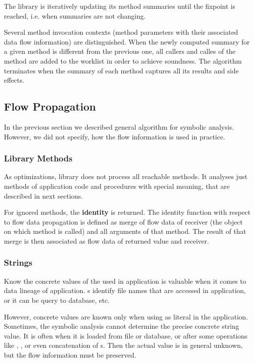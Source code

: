 The library is iteratively updating its method summaries until the fixpoint is reached, i.e.
when summaries are not changing.

Several method invocation contexts (method parameters with their associated data flow information)
are distinguished. When the newly computed summary for a given method is different from the previous
one, all callers and calles of the method are added to the worklist in order to achieve soundness.
The algorithm terminates when the summary of each method captures all its results and side effects.




\subsection{Flow Propagation}

In the previous section we described general algorithm for symbolic analysis.
However, we did not specify, how the flow information is used in practice.




\subsubsection{Library Methods}

As optimizations, library does not process all reachable methods.
It analyses just methods of application code and procedures with special
meaning, that are described in next sections.

For ignored methods, the \textbf{identity} is returned.
The identity function with respect to flow data propagation is defined as
merge of flow data of receiver (the object on which method is called) and
all arguments of that method. The result of that merge is then associated
as flow data of returned value and receiver.




\subsubsection{Strings}

Know the concrete values of the  used in application is valuable
when it comes to data lineage of application.
s identify file names that are accessed in application,
or it can be query to database, etc.

However, concrete values are known only when using as literal in the application.
Sometimes, the symbolic analysis cannot determine the precise concrete string value.
It is often when it is loaded from file or database, or after some operations
like , , or even concatenation of s.
Then the actual value is in general unknown, but the flow information must be preserved.




